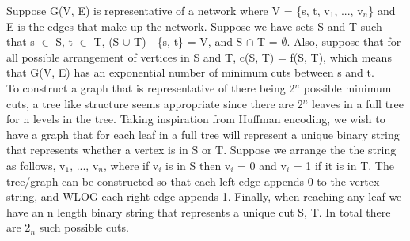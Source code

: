\documentclass[10pt]{csc_assignment}
\begin{document}
\begin{description}

\newpage
\item[Q1.]

Suppose G(V, E) is representative of a network where V = \{s, t, v$_{1}$, ..., v$_{n}$\} 
and E is the edges that make up the network. Suppose we have sets S and T such that
s $\in$ S, t $\in$ T, (S $\cup$ T) - \{s, t\} = V, and S $\cap$ T = $\emptyset$. Also, 
suppose that for all possible arrangement of vertices in S and T, c(S, T) = f(S, T), which means that G(V, E) has an exponential number of minimum cuts between s and t.\\
To construct a graph that is representative of there being 2$^{n}$ possible minimum cuts, a tree
like structure seems appropriate since there are 2$^{n}$ leaves in a full tree for n levels in the tree. Taking inspiration from Huffman encoding, we wish to have a graph that for each leaf in a full tree will represent a unique binary string that represents whether a vertex is in S or T. Suppose we arrange the the string as follows, v$_{1}$, ..., v$_{n}$, where if v$_{i}$ is in S then v$_{i}$ = 0 and v$_{i}$ = 1 if it is in T. The tree/graph can be constructed so that each left edge appends 0 to the vertex string, and WLOG each right edge appends 1. Finally, when reaching any leaf we have an n length binary string that represents a unique cut S, T. In total there are 2$_{n}$ such possible cuts.\\ 


\newpage
\item[Q2.]


\end{description}
\end{document}
